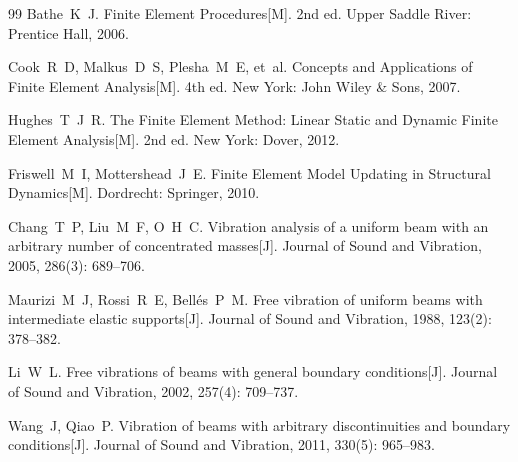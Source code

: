 \documentclass[twoside,12pt]{ctexart}
\begin{document}
\begin{thebibliography}{99}
Bathe~K~J. Finite Element Procedures[M]. 2nd ed. Upper Saddle River: Prentice
Hall, 2006.

Cook~R~D, Malkus~D~S, Plesha~M~E, et~al. Concepts and Applications of Finite
Element Analysis[M]. 4th ed. New York: John Wiley \& Sons, 2007.

Hughes~T~J~R. The Finite Element Method: Linear Static and Dynamic Finite
Element Analysis[M]. 2nd ed. New York: Dover, 2012.

Friswell~M~I, Mottershead~J~E. Finite Element Model Updating in Structural
Dynamics[M]. Dordrecht: Springer, 2010.

Chang~T~P, Liu~M~F, O~H~C. Vibration analysis of a uniform beam with an
arbitrary number of concentrated masses[J]. Journal of Sound and Vibration,
2005, 286(3): 689--706.

Maurizi~M~J, Rossi~R~E, Bell\'{e}s~P~M. Free vibration of uniform beams with
intermediate elastic supports[J]. Journal of Sound and Vibration, 1988, 123(2):
378--382.

Li~W~L. Free vibrations of beams with general boundary conditions[J]. Journal
of Sound and Vibration, 2002, 257(4): 709--737.

Wang~J, Qiao~P. Vibration of beams with arbitrary discontinuities and boundary
conditions[J]. Journal of Sound and Vibration, 2011, 330(5): 965--983.

\end{thebibliography}
\end{document}
